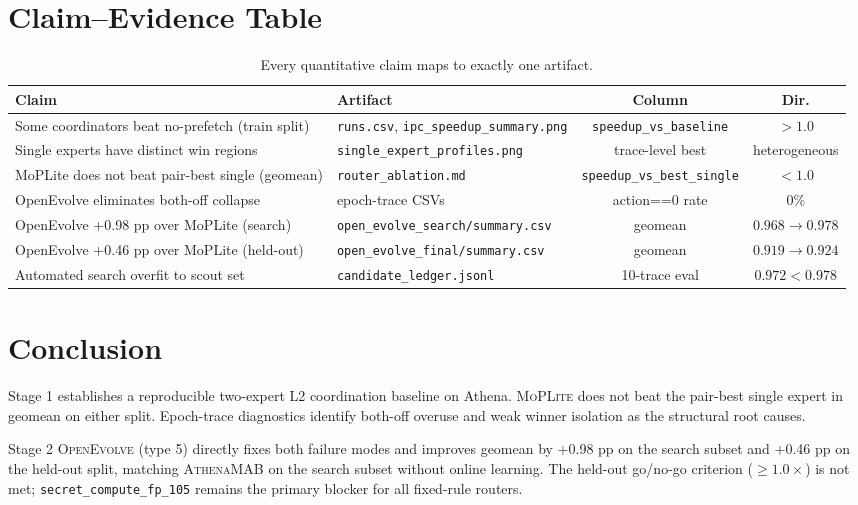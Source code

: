 \documentclass[10pt,twocolumn]{article}
\begin{document}
\section{Claim--Evidence Table}
\label{sec:evidence}

\begin{table}[t]
\centering
\caption{Every quantitative claim maps to exactly one artifact.}
\label{tab:claims}
\small
\begin{tabular}{p{6cm}p{4.5cm}cc}
\toprule
\textbf{Claim} & \textbf{Artifact} & \textbf{Column} & \textbf{Dir.} \\
\midrule
Some coordinators beat no-prefetch (train split) &
  \texttt{runs.csv}, \texttt{ipc\_speedup\_summary.png} &
  \texttt{speedup\_vs\_baseline} & $>1.0$ \\
Single experts have distinct win regions &
  \texttt{single\_expert\_profiles.png} &
  trace-level best & heterogeneous \\
MoPLite does not beat pair-best single (geomean) &
  \texttt{router\_ablation.md} &
  \texttt{speedup\_vs\_best\_single} & $<1.0$ \\
OpenEvolve eliminates both-off collapse &
  epoch-trace CSVs &
  action==0 rate & $0\%$ \\
OpenEvolve +0.98 pp over MoPLite (search) &
  \texttt{open\_evolve\_search/summary.csv} &
  geomean & $0.968\to0.978$ \\
OpenEvolve +0.46 pp over MoPLite (held-out) &
  \texttt{open\_evolve\_final/summary.csv} &
  geomean & $0.919\to0.924$ \\
Automated search overfit to scout set &
  \texttt{candidate\_ledger.jsonl} &
  10-trace eval & $0.972<0.978$ \\
\bottomrule
\end{tabular}
\end{table}

\section{Conclusion}
\label{sec:conclusion}

Stage 1 establishes a reproducible two-expert L2 coordination baseline on Athena.
\textsc{MoPLite} does not beat the pair-best single expert in geomean on either
split. Epoch-trace diagnostics identify both-off overuse and weak winner isolation
as the structural root causes.

Stage 2 \textsc{OpenEvolve} (type 5) directly fixes both failure modes and improves
geomean by +0.98 pp on the search subset and +0.46 pp on the held-out split,
matching \textsc{AthenaMAB} on the search subset without online learning. The
held-out go/no-go criterion ($\geq 1.0\times$) is not met; \texttt{secret\_compute\_fp\_105}
remains the primary blocker for all fixed-rule routers.
\end{document}
